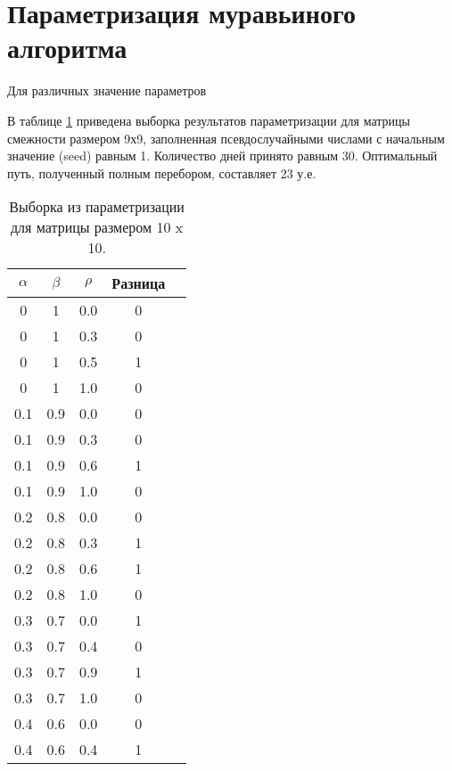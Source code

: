     \section{Параметризация муравьиного алгоритма}
        Для различных значение параметров

        В таблице \ref{table:test:params} приведена выборка результатов параметризации
        для матрицы смежности размером 9х9, 
        заполненная псевдослучайными числами с начальным значение (seed) равным 1.
        Количество дней принято равным 30. 
        Оптимальный путь, полученный полным перебором, составляет 23 у.е.

    \begin{table}[h!]
        \caption{Выборка из параметризации для матрицы размером 10 x 10.}
        \label{table:test:params}
        \centering
        \begin{tabular}{|c|c|c|c|c|}
            \hline
            $\alpha$        & $\beta$      & $\rho$  & Разница \\
            \hline
            0    & 1    & 0.0  & 0     \\
            0    & 1    & 0.3  & 0     \\
            0    & 1    & 0.5  & 1     \\
            0    & 1    & 1.0  & 0     \\
            \hline
            0.1  & 0.9  & 0.0  & 0     \\
            0.1  & 0.9  & 0.3  & 0     \\
            0.1  & 0.9  & 0.6  & 1     \\                    
            0.1  & 0.9  & 1.0  & 0     \\
            \hline
            0.2  & 0.8  & 0.0  & 0     \\
            0.2  & 0.8  & 0.3  & 1     \\
            0.2  & 0.8  & 0.6  & 1     \\
            0.2  & 0.8  & 1.0  & 0     \\
            \hline
            0.3  & 0.7  & 0.0  & 1     \\
            0.3  & 0.7  & 0.4  & 0     \\
            0.3  & 0.7  & 0.9  & 1     \\
            0.3  & 0.7  & 1.0  & 0     \\
            \hline
            0.4  & 0.6  & 0.0  & 0     \\
            0.4  & 0.6  & 0.4  & 1     \\

\end{tabular}
\end{table}
